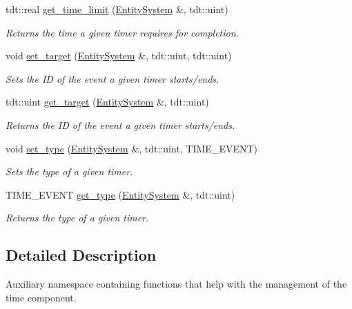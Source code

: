 \begin{DoxyCompactItemize}
tdt\+::real \hyperlink{namespace_time_helper_a8850fb15e18686713be8609142b92f67}{get\+\_\+time\+\_\+limit} (\hyperlink{class_entity_system}{Entity\+System} \&, tdt\+::uint)
\begin{DoxyCompactList}\small\item\em Returns the time a given timer requires for completion. \end{DoxyCompactList}\item 
void \hyperlink{namespace_time_helper_a547454bfc4b8be7ca3cb41b9818dd23a}{set\+\_\+target} (\hyperlink{class_entity_system}{Entity\+System} \&, tdt\+::uint, tdt\+::uint)
\begin{DoxyCompactList}\small\item\em Sets the ID of the event a given timer starts/ends. \end{DoxyCompactList}\item 
tdt\+::uint \hyperlink{namespace_time_helper_af962eb68dc7ab712bc19437908003960}{get\+\_\+target} (\hyperlink{class_entity_system}{Entity\+System} \&, tdt\+::uint)
\begin{DoxyCompactList}\small\item\em Returns the ID of the event a given timer starts/ends. \end{DoxyCompactList}\item 
void \hyperlink{namespace_time_helper_a1970e363bd595ec6fecaff6b3bae74f5}{set\+\_\+type} (\hyperlink{class_entity_system}{Entity\+System} \&, tdt\+::uint, T\+I\+M\+E\+\_\+\+E\+V\+E\+NT)
\begin{DoxyCompactList}\small\item\em Sets the type of a given timer. \end{DoxyCompactList}\item 
T\+I\+M\+E\+\_\+\+E\+V\+E\+NT \hyperlink{namespace_time_helper_acb059da1811b33e9a6e1016f3861fade}{get\+\_\+type} (\hyperlink{class_entity_system}{Entity\+System} \&, tdt\+::uint)
\begin{DoxyCompactList}\small\item\em Returns the type of a given timer. \end{DoxyCompactList}\end{DoxyCompactItemize}


\subsection{Detailed Description}
Auxiliary namespace containing functions that help with the management of the time component. 

